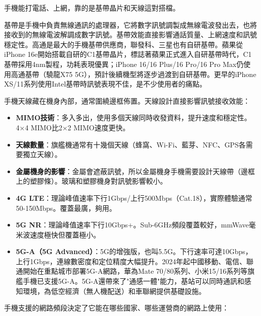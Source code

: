 
手機能打電話、上網，靠的是基帶晶片和天線這對搭檔。


基帶是手機中負責無線通訊的處理器，它將數字訊號調製成無線電波發出去，也將接收到的無線電波解調成數字訊號。基帶效能直接影響通話質量、上網速度和訊號穩定性。高通是最大的手機基帶供應商，聯發科、三星也有自研基帶。蘋果從iPhone 16e開始搭載自研的C1基帶晶片，標誌著蘋果正式進入自研基帶時代，C1基帶採用4nm製程，功耗表現優異；iPhone 16/16 Plus/16 Pro/16 Pro Max仍使用高通基帶（驍龍X75 5G），預計後續機型將逐步過渡到自研基帶。更早的iPhone XS/11系列使用Intel基帶時訊號表現不佳，是不少使用者的痛點。


手機天線藏在機身內部，通常圍繞邊框佈置。天線設計直接影響訊號接收效能：

\begin{itemize}
  \item \textbf{MIMO技術}：多入多出，使用多個天線同時收發資料，提升速度和穩定性。4×4 MIMO比2×2 MIMO速度更快。
  \item \textbf{天線數量}：旗艦機通常有十幾個天線（蜂窩、Wi-Fi、藍芽、NFC、GPS各需要獨立天線）。
  \item \textbf{金屬機身的影響}：金屬會遮蔽訊號，所以金屬機身手機需要設計天線帶（邊框上的塑膠條）。玻璃和塑膠機身對訊號影響較小。
\end{itemize}


\begin{itemize}
  \item \textbf{4G LTE}：理論峰值速率下行1Gbps/上行500Mbps（Cat.18），實際體驗通常50-150Mbps。覆蓋最廣，夠用。
  \item \textbf{5G NR}：理論峰值速率下行10Gbps+。Sub-6GHz頻段覆蓋較好，mmWave毫米波速度極快但覆蓋極小。
  \item \textbf{5G-A（5G Advanced）}：5G的增強版，也叫5.5G。下行速率可達10Gbps，上行1Gbps，連線數密度和定位精度大幅提升。2024年起中國移動、電信、聯通開始在重點城市部署5G-A網路，華為Mate 70/80系列、小米15/16系列等旗艦手機已支援5G-A。5G-A還帶來了"通感一體"能力，基站可以同時通訊和感知環境，為低空經濟（無人機配送）和車聯網提供基礎設施。
\end{itemize}


手機支援的網路頻段決定了它能在哪些國家、哪些運營商的網路上使用：


